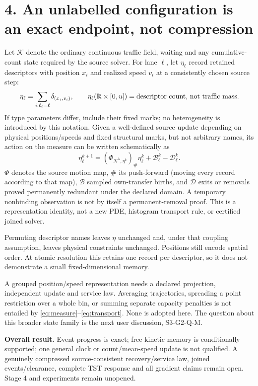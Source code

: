 \documentclass[11pt,a4paper]{article}
\begin{document}
\section*{4. An unlabelled configuration is an exact endpoint, not compression}
Let $\mathcal K$ denote the ordinary continuous traffic field, waiting and
any cumulative-count state required by the source solver. For lane $\ell$,
let $\eta_\ell$ record retained descriptors with position $x_i$ and realized
speed $v_i$ at a consistently chosen source step:
\begin{equation}
 \label{eq:measure}
 \eta_\ell=\sum_{i:\ell_i=\ell}\delta_{(x_i,v_i)},\qquad
 \eta_\ell(\mathbb R\times[0,u])=\hbox{descriptor count, not traffic mass}.
\end{equation}
If type parameters differ, include their fixed marks; no heterogeneity is
introduced by this notation. Given a well-defined source update depending on
physical positions/speeds and fixed structural marks, but not arbitrary names,
its action on the measure can be written schematically as
\begin{equation}
 \label{eq:transport}
 \eta_\ell^{k+1}
 = (\Phi_{\mathcal K^k,\eta^k})_\#\eta_\ell^k
   +\mathcal B_\ell^k-\mathcal D_\ell^k.
\end{equation}
$\Phi$ denotes the source motion map, $\#$ its push-forward (moving every
record according to that map), $\mathcal B$ sampled own-transfer births,
and $\mathcal D$ exits or removals proved permanently redundant under the
declared domain. A temporary nonbinding observation is not by itself a
permanent-removal proof. This is a representation identity, not a new PDE,
histogram transport rule, or certified joined solver.

Permuting descriptor names leaves $\eta$ unchanged and, under that coupling
assumption, leaves physical constraints unchanged. Positions still encode
spatial order. At atomic resolution this retains one record per descriptor,
so it does not demonstrate a small fixed-dimensional memory.

A grouped position/speed representation needs a declared projection,
independent update and service law. Averaging trajectories, spreading a point
restriction over a whole bin, or summing separate capacity penalties is not
entailed by \eqref{eq:measure}--\eqref{eq:transport}. None is adopted here. The question about this broader
state family is the next user discussion, S3-G2-Q-M.

\textbf{Overall result.} Event progress is exact; free kinetic memory is
conditionally supported; one general clock or count/mean-speed update is not
qualified. A genuinely compressed source-consistent recovery/service law,
joined events/clearance, complete TST response and all gradient claims remain
open. Stage 4 and experiments remain unopened.
\end{document}
